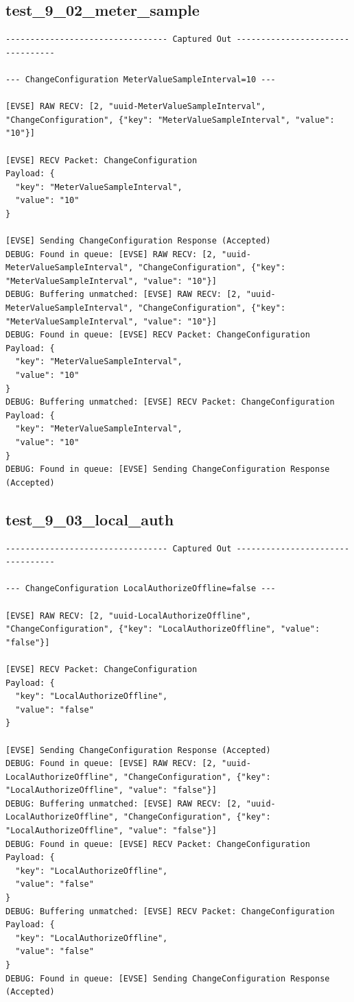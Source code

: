 \documentclass{article}
\begin{document}
\subsection*{test\_9\_02\_meter\_sample}
\begin{lstlisting}
--------------------------------- Captured Out ---------------------------------

--- ChangeConfiguration MeterValueSampleInterval=10 ---

[EVSE] RAW RECV: [2, "uuid-MeterValueSampleInterval", "ChangeConfiguration", {"key": "MeterValueSampleInterval", "value": "10"}]

[EVSE] RECV Packet: ChangeConfiguration
Payload: {
  "key": "MeterValueSampleInterval",
  "value": "10"
}

[EVSE] Sending ChangeConfiguration Response (Accepted)
DEBUG: Found in queue: [EVSE] RAW RECV: [2, "uuid-MeterValueSampleInterval", "ChangeConfiguration", {"key": "MeterValueSampleInterval", "value": "10"}]
DEBUG: Buffering unmatched: [EVSE] RAW RECV: [2, "uuid-MeterValueSampleInterval", "ChangeConfiguration", {"key": "MeterValueSampleInterval", "value": "10"}]
DEBUG: Found in queue: [EVSE] RECV Packet: ChangeConfiguration
Payload: {
  "key": "MeterValueSampleInterval",
  "value": "10"
}
DEBUG: Buffering unmatched: [EVSE] RECV Packet: ChangeConfiguration
Payload: {
  "key": "MeterValueSampleInterval",
  "value": "10"
}
DEBUG: Found in queue: [EVSE] Sending ChangeConfiguration Response (Accepted)
\end{lstlisting}
\subsection*{test\_9\_03\_local\_auth}
\begin{lstlisting}
--------------------------------- Captured Out ---------------------------------

--- ChangeConfiguration LocalAuthorizeOffline=false ---

[EVSE] RAW RECV: [2, "uuid-LocalAuthorizeOffline", "ChangeConfiguration", {"key": "LocalAuthorizeOffline", "value": "false"}]

[EVSE] RECV Packet: ChangeConfiguration
Payload: {
  "key": "LocalAuthorizeOffline",
  "value": "false"
}

[EVSE] Sending ChangeConfiguration Response (Accepted)
DEBUG: Found in queue: [EVSE] RAW RECV: [2, "uuid-LocalAuthorizeOffline", "ChangeConfiguration", {"key": "LocalAuthorizeOffline", "value": "false"}]
DEBUG: Buffering unmatched: [EVSE] RAW RECV: [2, "uuid-LocalAuthorizeOffline", "ChangeConfiguration", {"key": "LocalAuthorizeOffline", "value": "false"}]
DEBUG: Found in queue: [EVSE] RECV Packet: ChangeConfiguration
Payload: {
  "key": "LocalAuthorizeOffline",
  "value": "false"
}
DEBUG: Buffering unmatched: [EVSE] RECV Packet: ChangeConfiguration
Payload: {
  "key": "LocalAuthorizeOffline",
  "value": "false"
}
DEBUG: Found in queue: [EVSE] Sending ChangeConfiguration Response (Accepted)
\end{lstlisting}
\end{document}
